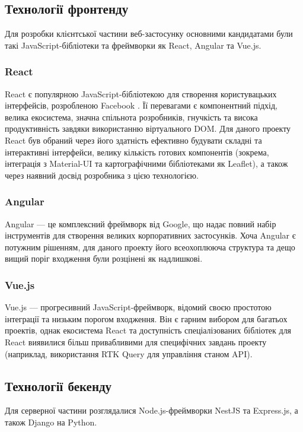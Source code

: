 \subsection{Технології фронтенду}
Для розробки клієнтської частини веб-застосунку основними кандидатами були такі JavaScript-бібліотеки та фреймворки як React, Angular та Vue.js.
\subsubsection{React}
React є популярною JavaScript-бібліотекою для створення користувацьких інтерфейсів, розробленою Facebook \cite{react}. Її перевагами є компонентний підхід, велика екосистема, значна спільнота розробників, гнучкість та висока продуктивність завдяки використанню віртуального DOM. Для даного проекту React був обраний через його здатність ефективно будувати складні та інтерактивні інтерфейси, велику кількість готових компонентів (зокрема, інтеграція з Material-UI та картографічними бібліотеками як Leaflet), а також через наявний досвід розробника з цією технологією.

\subsubsection{Angular}
Angular — це комплексний фреймворк від Google, що надає повний набір інструментів для створення великих корпоративних застосунків. Хоча Angular є потужним рішенням, для даного проекту його всеохоплююча структура та дещо вищий поріг входження були розцінені як надлишкові.

\subsubsection{Vue.js}
Vue.js — прогресивний JavaScript-фреймворк, відомий своєю простотою інтеграції та низьким порогом входження. Він є гарним вибором для багатьох проектів, однак екосистема React та доступність спеціалізованих бібліотек для React виявилися більш привабливими для специфічних завдань проекту (наприклад, використання RTK Query для управління станом API).

\subsection{Технології бекенду}
Для серверної частини розглядалися Node.js-фреймворки NestJS та Express.js, а також Django на Python.
